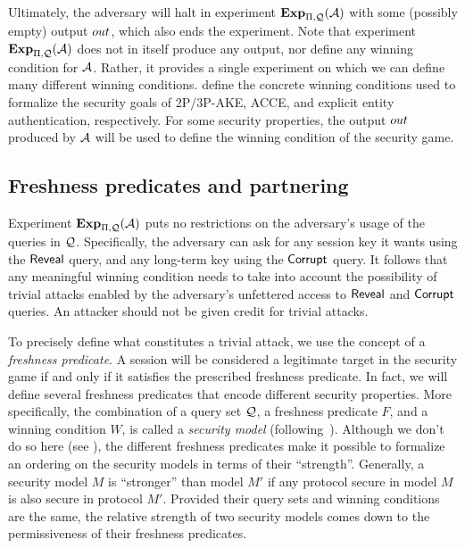 \bigskip

Ultimately,
the adversary will halt in experiment $\mathbf{Exp}_{\mathrm{\Pi},\mathcal{Q}}^{}(\mathcal{A})$ with some (possibly empty) output $out$,
which also ends the experiment.
Note that experiment $\mathbf{Exp}_{\mathrm{\Pi},\mathcal{Q}}^{}(\mathcal{A})$ does not in itself produce any output,
nor define any winning condition for $\mathcal{A}$.
Rather, it provides a single experiment on which we can define many different winning conditions.
 define the concrete winning conditions used to formalize the security goals of 2P/3P-AKE, ACCE,
and explicit entity authentication,
respectively.
For some security properties,
the output $out$ produced by $\mathcal{A}$ will be used to define the winning condition of the security game.







\subsection{Freshness predicates and partnering}\label{sec:definitions:partnering}

Experiment $\mathbf{Exp}_{\mathrm{\Pi},\mathcal{Q}}^{}(\mathcal{A})$ puts no restrictions on the adversary's usage of the queries in $\mathcal{Q}$.
Specifically,
the adversary can ask for any session key it wants using the $\mathsf{Reveal}$ query, and any long-term key using the $\mathsf{Corrupt}$ query.
It follows that any meaningful winning condition needs to take into account the possibility of trivial attacks enabled by the adversary's unfettered access to $\mathsf{Reveal}$ and $\mathsf{Corrupt}$ queries. 
An attacker should not be given credit for trivial attacks.

To precisely define what constitutes a trivial attack,
we use the concept of a \emph{freshness predicate}.
A session will be considered a legitimate target in the security game if
and only if
it satisfies the prescribed freshness predicate.
In fact,
we will define several freshness predicates that encode different security properties.
More specifically,
the combination of a query set $\mathcal{Q}$, 
a freshness predicate $F$,
and a winning condition $W$,
is called a \emph{security model} (following~\cite{ESORICS:CreFel12}).
Although we don't do so here (see \cite{ESORICS:CreFel12,EPRINT:FelCre14}),
the different freshness predicates make it possible to formalize an ordering on the security models in terms of their ``strength''.
Generally, a security model $M$ is ``stronger'' than model $M'$ if any protocol secure in model $M$ is also secure in protocol $M'$.
Provided their query sets and winning conditions are the same,
the relative strength of two security models comes down to the permissiveness of their freshness predicates.


